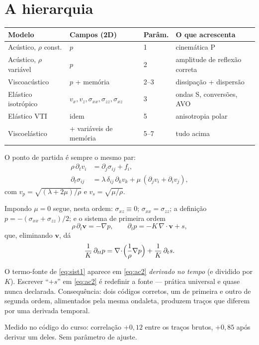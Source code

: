 \documentclass[11pt,a4paper,oneside]{report}
\begin{document}
\section{A hierarquia}

\begin{center}
\begin{tabular}{@{}lllp{4.6cm}@{}}
\toprule
\textbf{Modelo} & \textbf{Campos (2D)} & \textbf{Par\^am.} & \textbf{O que
acrescenta} \\
\midrule
Ac\'ustico, $\rho$ const. & $p$ & 1 & cinem\'atica P \\
Ac\'ustico, $\rho$ vari\'avel & $p$ & 2 & amplitude de reflex\~ao correta \\
Viscoac\'ustico & $p$ + mem\'oria & 2--3 & dissipa\c{c}\~ao + dispers\~ao \\
El\'astico isotr\'opico & $v_x,v_z,\sigma_{xx},\sigma_{zz},\sigma_{xz}$ & 3
  & ondas S, convers\~oes, AVO \\
El\'astico VTI & idem & 5 & anisotropia polar \\
Viscoel\'astico & + vari\'aveis de mem\'oria & 5--7 & tudo acima \\
\bottomrule
\end{tabular}
\end{center}

O ponto de partida \'e sempre o mesmo par:
\begin{align}
\rho\,\partial_t v_i &= \partial_j \sigma_{ij} + f_i , \\
\partial_t \sigma_{ij}
 &= \lambda\,\delta_{ij}\,\partial_k v_k
  + \mu\,(\partial_j v_i + \partial_i v_j),
\end{align}
com $v_p = \sqrt{(\lambda+2\mu)/\rho}$ e $v_s = \sqrt{\mu/\rho}$.

Impondo $\mu = 0$ segue, nesta ordem: $\sigma_{xz} \equiv 0$;
$\sigma_{xx} = \sigma_{zz}$; a defini\c{c}\~ao
$p = -(\sigma_{xx}+\sigma_{zz})/2$; e o sistema de primeira ordem
\begin{equation}
\rho\,\partial_t\mathbf{v} = -\nabla p,
\qquad
\partial_t p = -K\,\nabla\!\cdot\!\mathbf{v} + s ,
\label{eq:sist1}
\end{equation}
que, eliminando $\mathbf{v}$, d\'a
\begin{equation}
\frac{1}{K}\,\partial_{tt} p
 = \nabla\!\cdot\!\Bigl(\frac{1}{\rho}\nabla p\Bigr) + \frac{1}{K}\,\partial_t s .
\label{eq:ac2}
\end{equation}

\begin{armadilha}
O termo-fonte de \eqref{eq:sist1} aparece em \eqref{eq:ac2} \emph{derivado no
tempo} (e dividido por $K$). Escrever ``$+s$'' em \eqref{eq:ac2} \'e redefinir a fonte --- pr\'atica
universal e quase nunca declarada. Consequ\^encia: dois c\'odigos corretos, um
de primeira e outro de segunda ordem, alimentados pela mesma ondaleta,
produzem tra\c{c}os que diferem por uma derivada temporal.

Medido no c\'odigo do curso: correla\c{c}\~ao $+0{,}12$ entre os tra\c{c}os
brutos, $+0{,}85$ ap\'os derivar um deles. Sem par\^ametro de ajuste.
\end{armadilha}
\end{document}
